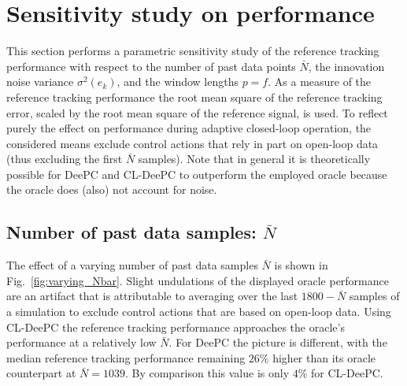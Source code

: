 \section{Sensitivity study on performance}
\noindent This section performs a parametric sensitivity study of the reference tracking performance with respect to the number of past data points $\bar{N}$, the innovation noise variance $\sigma^2(e_k)$, and the window lengths $p=f$. As a measure of the reference tracking performance the root mean square of the reference tracking error, scaled by the root mean square of the reference signal, is used. To reflect purely the effect on performance during adaptive closed-loop operation, the considered means exclude control actions that rely in part on open-loop data (thus excluding the first $\bar{N}$ samples). Note that in general it is theoretically possible for \ac{DeePC} and \ac{CL-DeePC} to outperform the employed oracle because the oracle does (also) not account for noise.

\subsection{Number of past data samples: $\bar{N}$}
\noindent The effect of a varying number of past data samples $\bar{N}$ is shown in Fig.~\ref{fig:varying_Nbar}. Slight undulations of the displayed oracle performance are an artifact that is attributable to averaging over the last $1800-\bar{N}$ samples of a simulation to exclude control actions that are based on open-loop data. Using \ac{CL-DeePC} the reference tracking performance approaches the oracle's performance at a relatively low $\bar{N}$. For \ac{DeePC} the picture is different, with the median reference tracking performance remaining $26\%$ higher than its oracle counterpart at $\bar{N}=1039$. By comparison this value is only $4\%$ for \ac{CL-DeePC}.

